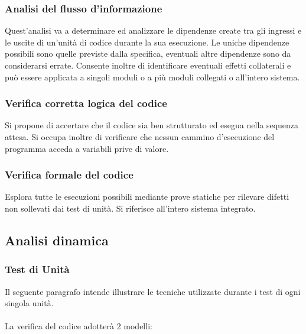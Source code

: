 \subsubsection*{Analisi del flusso d'informazione}

Quest'analisi va a determinare ed analizzare le dipendenze create tra gli
ingressi e le uscite di un'unit\`a di codice durante la sua esecuzione. Le uniche
dipendenze possibili sono quelle previste dalla specifica, eventuali altre
dipendenze sono da considerarsi errate. Consente inoltre di identificare
eventuali effetti collaterali e pu\`o essere applicata a singoli moduli o a pi\`u
moduli collegati o all'intero sistema.

\subsubsection*{Verifica corretta logica del codice}

Si propone di accertare che il codice sia ben strutturato ed esegua nella
sequenza attesa. Si occupa inoltre di verificare che nessun cammino
d'esecuzione del programma acceda a variabili prive di valore.

\subsubsection*{Verifica formale del codice}

Esplora tutte le esecuzioni possibili mediante prove statiche per rilevare
difetti non sollevati dai test di unit\`a. Si riferisce all'intero sistema integrato.

\subsection{Analisi dinamica}

\subsubsection*{Test di Unit\`a}
Il seguente paragrafo intende illustrare le tecniche utilizzate durante i test
di ogni singola unit\`a.\\ \\
La verifica del codice adotter\`a 2 modelli:

